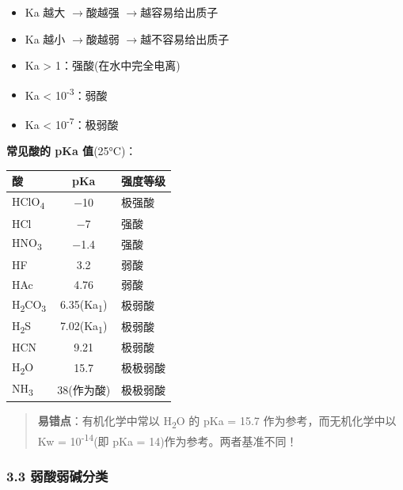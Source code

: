 \documentclass[a4paper,11pt]{ctexart}
\providecommand{\tightlist}{\setlength{\itemsep}{0pt}\setlength{\parskip}{0pt}}
\newcounter{none}
\newcommand{\箭}{\ensuremath{\rightarrow}}
\newcommand{\左箭}{\ensuremath{\leftarrow}}
\newcommand{\上箭}{\ensuremath{\uparrow}}
\newcommand{\下箭}{\ensuremath{\downarrow}}
\newcommand{\衡}{\ensuremath{\rightleftharpoons}}
\newcommand{\双箭}{\ensuremath{\leftrightarrow}}
\newcommand{\约等于}{\ensuremath{\approx}}
\newcommand{\小于等于}{\ensuremath{\leq}}
\newcommand{\大于等于}{\ensuremath{\geq}}
\newcommand{\不等于}{\ensuremath{\neq}}
\newcommand{\西格马}{\ensuremath{\sigma}}
\newcommand{\派}{\ensuremath{\pi}}
\begin{document}
\begin{itemize}
\tightlist
\item
  Ka 越大 \箭 酸越强 \箭 越容易给出质子
\item
  Ka 越小 \箭 酸越弱 \箭 越不容易给出质子
\item
  Ka \textgreater{} 1：强酸(在水中完全电离)
\item
  Ka \textless{} 10\textsuperscript{-3}：弱酸
\item
  Ka \textless{} 10\textsuperscript{-7}：极弱酸
\end{itemize}

\textbf{常见酸的 pKa 值}(25°C)：

{\def\LTcaptype{none} %
\begin{longtable}[]{@{}lcl@{}}
\toprule\noalign{}
酸 & pKa & 强度等级 \\
\midrule\noalign{}
\endhead
\bottomrule\noalign{}
\endlastfoot
HClO\textsubscript{4} & −10 & 极强酸 \\
HCl & −7 & 强酸 \\
HNO\textsubscript{3} & −1.4 & 强酸 \\
HF & 3.2 & 弱酸 \\
HAc & 4.76 & 弱酸 \\
H\textsubscript{2}CO\textsubscript{3} & 6.35(Ka\textsubscript{1}) & 极弱酸 \\
H\textsubscript{2}S & 7.02(Ka\textsubscript{1}) & 极弱酸 \\
HCN & 9.21 & 极弱酸 \\
H\textsubscript{2}O & 15.7 & 极极弱酸 \\
NH\textsubscript{3} & 38(作为酸) & 极极弱酸 \\
\end{longtable}
}

\begin{quote}
\textbf{易错点}：有机化学中常以 H\textsubscript{2}O 的 pKa = 15.7 作为参考，而无机化学中以 Kw = 10\textsuperscript{-14}(即 pKa = 14)作为参考。两者基准不同！
\end{quote}

\subsubsection{3.3 弱酸弱碱分类}\label{ux5f31ux9178ux5f31ux78b1ux5206ux7c7b}
\end{document}
